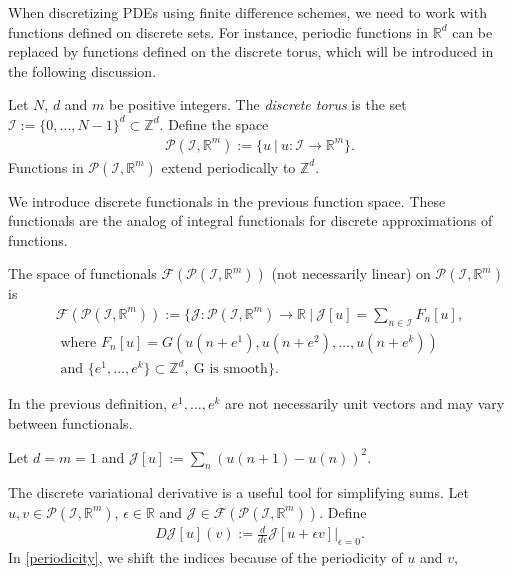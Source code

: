 \documentclass[runningheads]{llncs}
\newcommand{\Rr}{\mathbb{R}}
\newcommand{\Zz}{{\mathbb{Z}}}
\newcommand{\1}{\chi}
\newcommand{\Ii}{\mathcal{I}}
\begin{document}
When discretizing PDEs using finite difference schemes, we need to work with functions defined on discrete sets. For instance, periodic functions in $\Rr^d$ can be replaced by functions defined on the discrete torus, which will be introduced in the following discussion.
\begin{definition}
	\label{d1}
	Let $N$, $d$ and $m$ be positive integers. The \emph{discrete torus} is the set $\Ii:=\{0,\ldots,N-1\}^d\subset \Zz^d$. Define the space
	\begin{gather*}
		\mathcal{P}(\Ii,\Rr^m):=\{u\ |\ u:\Ii\rightarrow\Rr^m\}.
	\end{gather*}
Functions in $\mathcal{P}(\Ii,\Rr^m)$ extend periodically to $\Zz^d$.
\end{definition}
We introduce discrete functionals in the previous function space. These functionals are the analog of integral functionals for discrete approximations of functions.
\begin{definition}
	\label{d2}
	The space of functionals $\mathcal{F}(\mathcal{P}(\Ii,\Rr^m))$ (not necessarily linear) on $\mathcal{P}(\Ii,\Rr^m)$ is
	\begin{gather*}
		\mathcal{F}(\mathcal{P}(\Ii,\Rr^m)):= \Bigg\{\mathcal{J}:\mathcal{P}(\Ii,\Rr^m)\to \Rr\ \Bigg|\ \mathcal{J}[u]=\sum_{n\in\Ii}F_n[u],\\
		\text{ where }
		F_n[u]=G(u(n+e^1),u(n+e^2),\ldots,u(n+e^k))\\
		\text{ and }\{e^1,\ldots,e^k\}\subset\Zz^d,\ \text{G is smooth}
		\Bigg\}.
	\end{gather*}
\end{definition}
In the previous definition, $e^1,\ldots,e^k$ are not necessarily unit vectors and may vary between functionals.
\begin{example}
	\label{functional1}
	Let $d=m=1$ and
	$	\mathcal{J}[u]:=\sum_{n}(u(n+1)-u(n))^2$.
\end{example}
The discrete variational derivative is a useful tool for simplifying sums.
Let $u,v\in\mathcal{P}(\Ii,\Rr^m)$, $\epsilon 
\in\Rr$ and $\mathcal{J}\in\mathcal{F}(\mathcal{P}(\Ii,\Rr^m))$. Define
\begin{gather*}
	D\mathcal{J}[u](v):=\frac{d}{d\epsilon}\mathcal{J}[u+\epsilon v]\bigg|_{\epsilon=0}.
\end{gather*}
In \eqref{periodicity}, we shift the indices because of the periodicity of $u$ and $v$,
\end{document}
